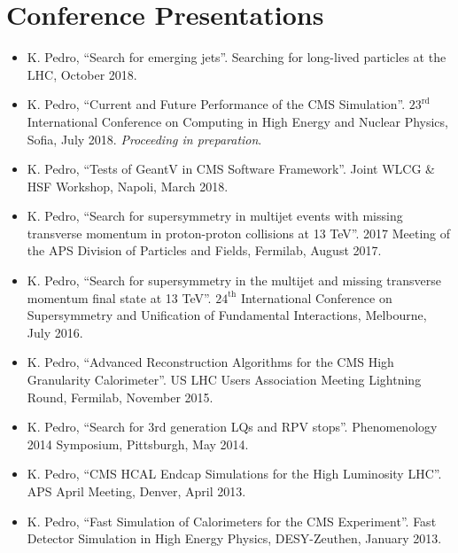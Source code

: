 \section{Conference Presentations}
\begin{itemize}[leftmargin=12pt]
\item K. Pedro, ``Search for emerging jets''. Searching for long-lived particles at the LHC, October 2018.
\item K. Pedro, ``Current and Future Performance of the CMS Simulation''. $23^{\text{rd}}$ International Conference on Computing in High Energy and Nuclear Physics, Sofia, July 2018. \emph{Proceeding in preparation}.
\ifdefined\longflag
\item K. Pedro, ``Tests of GeantV in CMS Software Framework''. Joint WLCG \& HSF Workshop, Napoli, March 2018.
\fi
\item K. Pedro, ``Search for supersymmetry in multijet events with missing transverse momentum in proton-proton collisions at 13 TeV''. 2017 Meeting of the APS Division of Particles and Fields, Fermilab, August 2017.
\item K. Pedro, ``Search for supersymmetry in the multijet and missing transverse momentum final state at 13 TeV''. $24^{\text{th}}$ International Conference on Supersymmetry and Unification of Fundamental Interactions, Melbourne, July 2016.
\item K. Pedro, ``Advanced Reconstruction Algorithms for the CMS High Granularity Calorimeter''. US LHC Users Association Meeting Lightning Round, Fermilab, November 2015.
\item K. Pedro, ``Search for 3rd generation LQs and RPV stops''. Phenomenology 2014 Symposium, Pittsburgh, May 2014.
\item K. Pedro, ``CMS HCAL Endcap Simulations for the High Luminosity LHC''. APS April Meeting, Denver, April 2013.
\item K. Pedro, ``Fast Simulation of Calorimeters for the CMS Experiment''. Fast Detector Simulation in High Energy Physics, DESY-Zeuthen, January 2013.
\end{itemize}

\ifdefined\longflag
